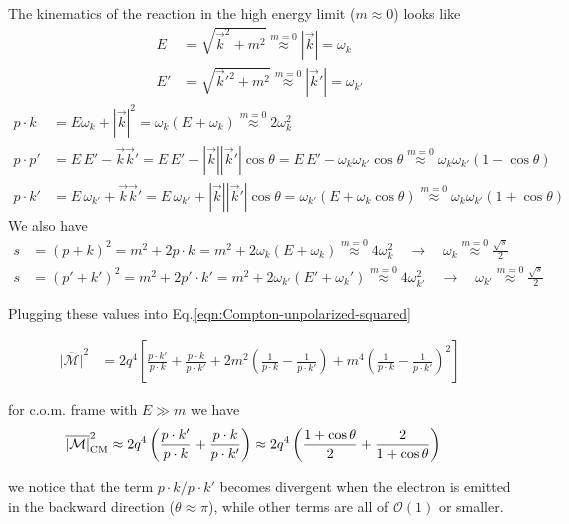 \documentclass[TheoreticalPhy_ModB.tex]{subfiles}
\begin{document}
\begin{figure}[H]
\centering

\end{figure}

The kinematics of the reaction in the high energy limit ($m\approx0$) looks like
\begin{align*}
E&=\sqrt{\vec k^2+m^2}\overset{m=0}{\approx}|\vec k|=\omega_k\\
E'&=\sqrt{\vec k'^2+m^2}\overset{m=0}{\approx}|\vec k'|=\omega_{k'}
\end{align*}
\begin{align*}
p\cdot k\,&=E\omega_k+|\vec k|^2=\omega_k(E+\omega_k)\overset{m=0}{\approx}2\omega_k^2\\
p\cdot p'&=E\,E'-\vec k\vec k'=E\,E'-|\vec k||\vec k'|\cos\theta=E\,E'-\omega_k\omega_{k'}\cos\theta\overset{m=0}{\approx}\omega_k\omega_{k'}(1-\cos\theta)\\
p\cdot k'&=E\,\omega_{k'}+\vec k\vec k'=E\,\omega_{k'}+|\vec k||\vec k'|\cos\theta=\omega_{k'}(E+\omega_k\cos\theta)\overset{m=0}{\approx}\omega_k\omega_{k'}(1+\cos\theta)
\end{align*}
We also have
\begin{align*}
s&=(p+k)^2=m^2+2p\cdot k=m^2+2\omega_k(E+\omega_k)\overset{m=0}{\approx}4\omega_k^2 \quad\rightarrow\quad \omega_k\overset{m=0}{\approx}\frac{\sqrt s}{2}\\
s&=(p'+k')^2=m^2+2p'\cdot k'=m^2+2\omega_{k'}(E'+\omega_k')\overset{m=0}{\approx}4\omega_{k'}^2 \quad\rightarrow\quad \omega_{k'}\overset{m=0}{\approx}\frac{\sqrt s}{2}
\end{align*}

Plugging these values into Eq.\eqref{eqn:Compton-unpolarized-squared}

\begin{align*}
\overline{|\mathcal M|}^2
&=2q^4\left[\frac{p\cdot k'}{p\cdot k}+\frac{p\cdot k}{p\cdot k'}+2m^2\left(\frac1{p\cdot k}-\frac1{p\cdot k'}\right)+m^4\left(\frac1{p\cdot k}-\frac1{p\cdot k'}\right)^2\right]
\end{align*}

for c.o.m. frame with $E\gg m$ we have 
\begin{align*}
\overline{|\mathcal M|}_{\textup{CM}}^2
&\approx2q^4\left(\frac{p\cdot k'}{p\cdot k}+\frac{p\cdot k}{p\cdot k'}\right)\approx2q^4\left(\frac{1+\cos\theta}{2}+\frac{2}{1+\cos\theta}\right)
\end{align*}

we notice that the term $p\cdot k/p\cdot k'$ becomes divergent when the electron is emitted in the backward direction ($\theta\approx\pi$), while other terms are all of $\mathcal O(1)$ or smaller.
\end{document}
